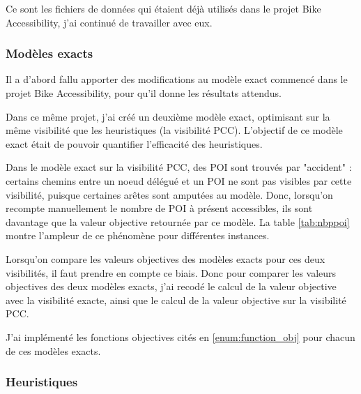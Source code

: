 Ce sont les fichiers de données qui étaient déjà utilisés dans le projet Bike Accessibility, j'ai continué de travailler avec eux. 

\subsubsection{Modèles exacts}

Il a d'abord fallu apporter des modifications au modèle exact commencé dans le projet Bike Accessibility, pour qu'il donne les résultats attendus.

Dans ce même projet, j'ai créé un deuxième modèle exact, optimisant sur la même visibilité que les heuristiques (la visibilité PCC). L'objectif de ce modèle exact était de pouvoir quantifier l'efficacité des heuristiques. 


Dans le modèle exact sur la visibilité PCC, des POI sont trouvés par "accident" : certains chemins entre un noeud délégué et un POI ne sont pas visibles par cette visibilité, puisque certaines arêtes sont amputées au modèle. Donc, lorsqu'on recompte manuellement le nombre de POI à présent accessibles, ils sont davantage que la valeur objective retournée par ce modèle. La table \ref{tab:nbppoi} montre l'ampleur de ce phénomène pour différentes instances.

Lorsqu'on compare les valeurs objectives des modèles exacts pour ces deux visibilités, il faut prendre en compte ce biais. Donc pour comparer les valeurs objectives des deux modèles exacts, j'ai recodé le calcul de la valeur objective avec la visibilité exacte, ainsi que le calcul de la valeur objective sur la visibilité PCC.

J'ai implémenté les fonctions objectives cités en \ref{enum:function_obj} pour chacun de ces modèles exacts.

\subsubsection{Heuristiques}

